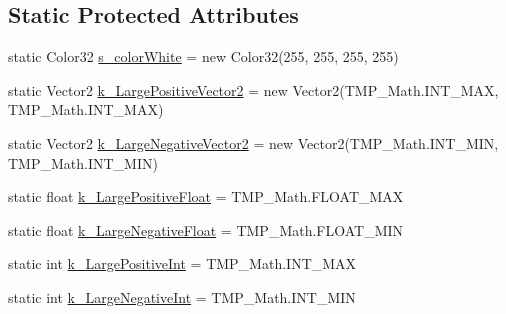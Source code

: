 \subsection*{Static Protected Attributes}
\begin{DoxyCompactItemize}
\item 
static Color32 \mbox{\hyperlink{class_t_m_pro_1_1_t_m_p___text_acb51fd11a369b5109c803b6c57b284d1}{s\+\_\+color\+White}} = new Color32(255, 255, 255, 255)
\item 
static Vector2 \mbox{\hyperlink{class_t_m_pro_1_1_t_m_p___text_aaf5c08b0131c1c880dae18608c6354ec}{k\+\_\+\+Large\+Positive\+Vector2}} = new Vector2(T\+M\+P\+\_\+\+Math.\+I\+N\+T\+\_\+\+M\+AX, T\+M\+P\+\_\+\+Math.\+I\+N\+T\+\_\+\+M\+AX)
\item 
static Vector2 \mbox{\hyperlink{class_t_m_pro_1_1_t_m_p___text_ab5090717466f6213bcb85a5020ee7ab0}{k\+\_\+\+Large\+Negative\+Vector2}} = new Vector2(T\+M\+P\+\_\+\+Math.\+I\+N\+T\+\_\+\+M\+IN, T\+M\+P\+\_\+\+Math.\+I\+N\+T\+\_\+\+M\+IN)
\item 
static float \mbox{\hyperlink{class_t_m_pro_1_1_t_m_p___text_a12c13a6fa8ef8fb4e21c5a753a1da82f}{k\+\_\+\+Large\+Positive\+Float}} = T\+M\+P\+\_\+\+Math.\+F\+L\+O\+A\+T\+\_\+\+M\+AX
\item 
static float \mbox{\hyperlink{class_t_m_pro_1_1_t_m_p___text_aedf25b4d3a330988d56f68546ab45c3c}{k\+\_\+\+Large\+Negative\+Float}} = T\+M\+P\+\_\+\+Math.\+F\+L\+O\+A\+T\+\_\+\+M\+IN
\item 
static int \mbox{\hyperlink{class_t_m_pro_1_1_t_m_p___text_ae4c455c8906f409fee0fc19494ea3c43}{k\+\_\+\+Large\+Positive\+Int}} = T\+M\+P\+\_\+\+Math.\+I\+N\+T\+\_\+\+M\+AX
\item 
static int \mbox{\hyperlink{class_t_m_pro_1_1_t_m_p___text_a46c91708162057abbc6b473a322be4a0}{k\+\_\+\+Large\+Negative\+Int}} = T\+M\+P\+\_\+\+Math.\+I\+N\+T\+\_\+\+M\+IN
\end{DoxyCompactItemize}
